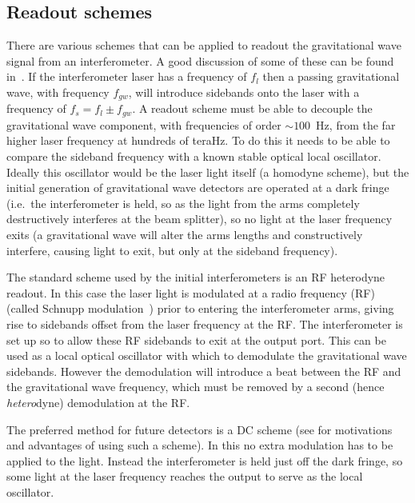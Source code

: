 \documentclass{article}
\begin{document}
\subsection{Readout schemes}\label{sec:readout}
There are various schemes that can be applied to readout the gravitational wave
signal from an interferometer. A good discussion of some of these can be found
in~\cite{Hild:2009}. If the interferometer laser has a frequency of $f_l$ then a
passing gravitational wave, with frequency $f_{gw}$, will introduce sidebands
onto the laser with a frequency of $f_s = f_l \pm f_{gw}$. A readout scheme must
be able to decouple the gravitational wave component, with frequencies of order
$\sim100$~Hz, from the far higher laser frequency at hundreds of teraHz. To do
this it needs to be able to compare the sideband frequency with a known stable
optical local oscillator. Ideally this oscillator would be the laser light
itself (a homodyne scheme), but the initial generation of gravitational wave
detectors are operated at a dark fringe (i.e.~the interferometer is held, so as
the light from the arms completely destructively interferes at the beam
splitter), so no light at the laser frequency exits (a gravitational wave will
alter the arms lengths and constructively interfere, causing light to exit, but
only at the sideband frequency).

The standard scheme used by the initial interferometers is an RF heterodyne
readout. In this case the laser light is modulated at a radio frequency (RF)
(called Schnupp modulation~\cite{Schnupp:1988}) prior to entering the
interferometer arms, giving rise to sidebands offset from the laser frequency at
the RF. The interferometer is set up so to allow these RF sidebands to exit at
the output port. This can be used as a local optical oscillator with which to
demodulate the gravitational wave sidebands. However the demodulation will
introduce a beat between the RF and the gravitational wave frequency, which must
be removed by a second (hence \textit{hetero}dyne) demodulation at the RF.

The preferred method for future detectors is a DC scheme (see
\cite{Fritschel:2003, Ward:2008, Hild:2009} for motivations and advantages of
using such a scheme). In this no extra modulation has to be applied to the
light. Instead the interferometer is held just off the dark fringe, so some
light at the laser frequency reaches the output to serve as the local
oscillator.

\end{document}
